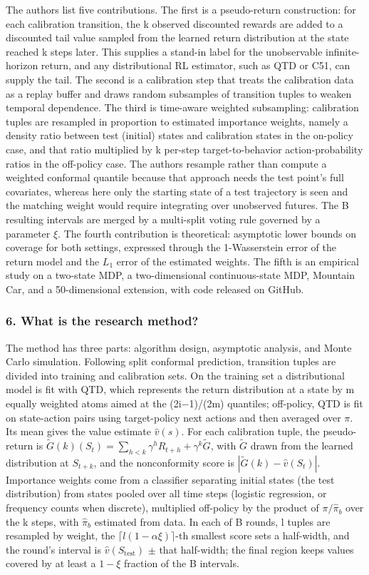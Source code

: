 \documentclass[11pt]{article}
\newcommand{\question}[1]{\subsubsection*{#1}}
\begin{document}
The authors list five contributions. The first is a pseudo-return construction: for each calibration transition, the k observed discounted rewards are added to a discounted tail value sampled from the learned return distribution at the state reached k steps later. This supplies a stand-in label for the unobservable infinite-horizon return, and any distributional RL estimator, such as QTD or C51, can supply the tail. The second is a calibration step that treats the calibration data as a replay buffer and draws random subsamples of transition tuples to weaken temporal dependence. The third is time-aware weighted subsampling: calibration tuples are resampled in proportion to estimated importance weights, namely a density ratio between test (initial) states and calibration states in the on-policy case, and that ratio multiplied by k per-step target-to-behavior action-probability ratios in the off-policy case. The authors resample rather than compute a weighted conformal quantile because that approach needs the test point's full covariates, whereas here only the starting state of a test trajectory is seen and the matching weight would require integrating over unobserved futures. The B resulting intervals are merged by a multi-split voting rule governed by a parameter \ensuremath{\xi}. The fourth contribution is theoretical: asymptotic lower bounds on coverage for both settings, expressed through the 1-Wasserstein error of the return model and the $L_1$ error of the estimated weights. The fifth is an empirical study on a two-state MDP, a two-dimensional continuous-state MDP, Mountain Car, and a 50-dimensional extension, with code released on GitHub.

\question{6. What is the research method?}

The method has three parts: algorithm design, asymptotic analysis, and Monte Carlo simulation. Following split conformal prediction, transition tuples are divided into training and calibration sets. On the training set a distributional model is fit with QTD, which represents the return distribution at a state by m equally weighted atoms aimed at the (2i\ensuremath{-}1)/(2m) quantiles; off-policy, QTD is fit on state-action pairs using target-policy next actions and then averaged over \ensuremath{\pi}. Its mean gives the value estimate $\hat{v}(s)$. For each calibration tuple, the pseudo-return is $\tilde{G}(k)(S_t) = \sum_{h<k} \gamma^h R_{t+h} + \gamma^k \tilde{G}$, with $\tilde{G}$ drawn from the learned distribution at $S_{t+k}$, and the nonconformity score is $|\tilde{G}(k) - \hat{v}(S_t)|$. Importance weights come from a classifier separating initial states (the test distribution) from states pooled over all time steps (logistic regression, or frequency counts when discrete), multiplied off-policy by the product of $\pi/\hat{\pi}_b$ over the k steps, with $\hat{\pi}_b$ estimated from data. In each of B rounds, l tuples are resampled by weight, the $\lceil l(1 - \alpha\xi) \rceil$-th smallest score sets a half-width, and the round's interval is $\hat{v}(S_{\mathrm{test}})$ \ensuremath{\pm} that half-width; the final region keeps values covered by at least a $1 - \xi$ fraction of the B intervals.
\end{document}
